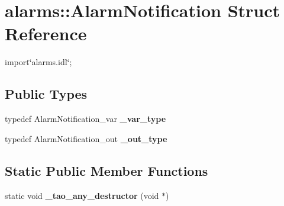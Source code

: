 \section{alarms\+:\+:Alarm\+Notification Struct Reference}
\label{structalarms_1_1AlarmNotification}


{\ttfamily import\char`\"{}alarms.\+idl\char`\"{};}

\subsection*{Public Types}
\begin{DoxyCompactItemize}
\item 
typedef Alarm\+Notification\+\_\+var {\bfseries \+\_\+var\+\_\+type}\label{structalarms_1_1AlarmNotification_a44d4b4fa9f64dd18cd863d59c8d28aa6}

\item 
typedef Alarm\+Notification\+\_\+out {\bfseries \+\_\+out\+\_\+type}\label{structalarms_1_1AlarmNotification_a07155314ccae99da0090944b58ff0a07}

\end{DoxyCompactItemize}
\subsection*{Static Public Member Functions}
\begin{DoxyCompactItemize}
\item 
static void {\bfseries \+\_\+tao\+\_\+any\+\_\+destructor} (void $\ast$)\label{structalarms_1_1AlarmNotification_a6e739ee7bf7ca855e90ce5e7e6ca7337}

\end{DoxyCompactItemize}
